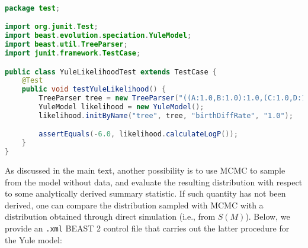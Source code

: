 \documentclass[oneside]{article}
\begin{document}
{\small
\singlespacing
\begin{lstlisting}[language=Java, caption=Java unit test for Yule model
  likelihood function given a small phylogenetic tree.,label={lst:yuleunit}]
  
package test;

import org.junit.Test;
import beast.evolution.speciation.YuleModel;
import beast.util.TreeParser;
import junit.framework.TestCase;

public class YuleLikelihoodTest extends TestCase {
    @Test
    public void testYuleLikelihood() {
        TreeParser tree = new TreeParser("((A:1.0,B:1.0):1.0,(C:1.0,D:1.0):1.0);");
        YuleModel likelihood = new YuleModel();
        likelihood.initByName("tree", tree, "birthDiffRate", "1.0");

        assertEquals(-6.0, likelihood.calculateLogP());
    }
}
\end{lstlisting}
}

As discussed in the main text, another possibility is to use MCMC to
sample from the model without data, and evaluate the resulting
distribution with respect to some analytically derived summary
statistic.
If such quantity has not been derived, one can compare the
distribution sampled with MCMC with a distribution obtained through
direct simulation (i.e., from $S(M)$).
Below, we provide an \texttt{.xml} BEAST 2 control file that carries
out the latter procedure for the Yule model:
\end{document}
